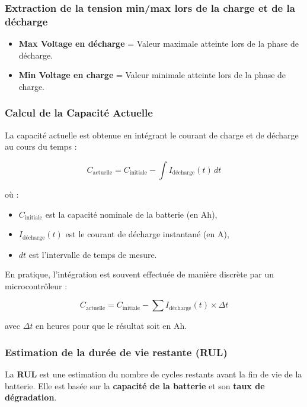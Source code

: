 \subsubsection*{Extraction de la tension min/max lors de la charge et de la décharge}
\begin{itemize}
	\item \textbf{Max Voltage en décharge} = Valeur maximale atteinte lors de la phase de décharge.
	\item \textbf{Min Voltage en charge} = Valeur minimale atteinte lors de la phase de charge.
\end{itemize}


\subsubsection*{Calcul de la Capacité Actuelle}  
La capacité actuelle est obtenue en intégrant le courant de charge et de décharge au cours du temps :  

\begin{equation}
C_{\text{actuelle}} = C_{\text{initiale}} - \int I_{\text{décharge}}(t) \, dt
\end{equation}

où :  
\begin{itemize}
	\item $C_{\text{initiale}}$ est la capacité nominale de la batterie (en Ah),
	\item $I_{\text{décharge}}(t)$ est le courant de décharge instantané (en A),
	\item $dt$ est l'intervalle de temps de mesure.
\end{itemize}

En pratique, l'intégration est souvent effectuée de manière discrète par un microcontrôleur :  

\begin{equation}
C_{\text{actuelle}} = C_{\text{initiale}} - \sum I_{\text{décharge}}(t) \times \Delta t
\end{equation}

avec $\Delta t$ en heures pour que le résultat soit en Ah.

\subsubsection*{Estimation de la durée de vie restante (RUL)}
La \textbf{RUL} est une estimation du nombre de cycles restants avant la fin de vie de la batterie. Elle est basée sur la \textbf{capacité de la batterie} et son \textbf{taux de dégradation}.

